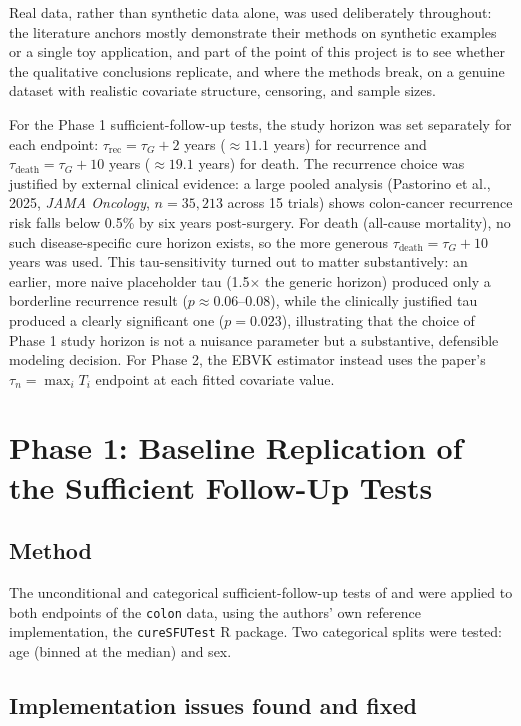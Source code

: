 \documentclass[11pt]{article}
\begin{document}
Real data, rather than synthetic data alone, was used deliberately throughout: the
literature anchors mostly demonstrate their methods on synthetic examples or a
single toy application, and part of the point of this project is to see whether
the qualitative conclusions replicate, and where the methods break, on a genuine
dataset with realistic covariate structure, censoring, and sample sizes.

For the Phase 1 sufficient-follow-up tests, the study horizon was set separately
for each endpoint: $\tau_{\mathrm{rec}}=\tau_G+2$ years ($\approx 11.1$ years) for
recurrence and $\tau_{\mathrm{death}}=\tau_G+10$ years ($\approx 19.1$ years)
for death. The recurrence choice was justified by external clinical evidence:
a large pooled analysis (Pastorino et al., 2025, \textit{JAMA Oncology}, $n=35{,}213$
across 15 trials) shows colon-cancer recurrence risk falls below 0.5\% by six years
post-surgery. For death (all-cause mortality), no such disease-specific cure horizon
exists, so the more generous $\tau_{\mathrm{death}}=\tau_G+10$ years was used. This tau-sensitivity turned
out to matter substantively: an earlier, more naive placeholder tau (1.5$\times$ the
generic horizon) produced only a borderline recurrence result ($p \approx 0.06$–$0.08$),
while the clinically justified tau produced a clearly significant one ($p=0.023$),
illustrating that the choice of Phase 1 study horizon is not a nuisance parameter
but a substantive, defensible modeling decision. For Phase 2, the EBVK estimator instead
uses the paper's $\tau_n=\max_i T_i$ endpoint at each fitted covariate value.


\section{Phase 1: Baseline Replication of the Sufficient Follow-Up Tests}

\subsection{Method}

The unconditional and categorical sufficient-follow-up tests of
\citet{yuenmusta2024} and \citet{yuenmustavankeilegom2025} were applied to both
endpoints of the \texttt{colon} data, using the authors' own reference
implementation, the \texttt{cureSFUTest} R package. Two categorical splits were
tested: age (binned at the median) and sex.

\subsection{Implementation issues found and fixed}
\end{document}
